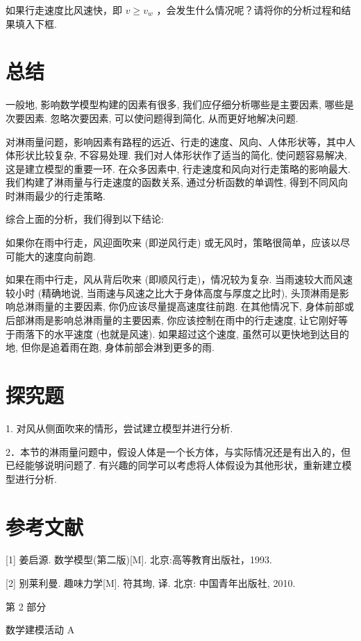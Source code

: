 \documentclass[10pt]{article}
\begin{document}
如果行走速度比风速快，即 \(v \geq  {v}_{w}\) ，会发生什么情况呢？请将你的分析过程和结果填入下框.

\section*{总结}

一般地, 影响数学模型构建的因素有很多, 我们应仔细分析哪些是主要因素, 哪些是次要因素. 忽略次要因素, 可以使问题得到简化, 从而更好地解决问题.

对淋雨量问题，影响因素有路程的远近、行走的速度、风向、人体形状等，其中人体形状比较复杂, 不容易处理. 我们对人体形状作了适当的简化, 使问题容易解决, 这是建立模型的重要一环. 在众多因素中, 行走速度和风向对行走策略的影响最大. 我们构建了淋雨量与行走速度的函数关系, 通过分析函数的单调性, 得到不同风向时淋雨最少的行走策略.

综合上面的分析，我们得到以下结论:

如果你在雨中行走，风迎面吹来 (即逆风行走) 或无风时，策略很简单，应该以尽可能大的速度向前跑.

如果在雨中行走，风从背后吹来 (即顺风行走)，情况较为复杂. 当雨速较大而风速较小时 (精确地说, 当雨速与风速之比大于身体高度与厚度之比时), 头顶淋雨是影响总淋雨量的主要因素, 你仍应该尽量提高速度往前跑. 在其他情况下, 身体前部或后部淋雨是影响总淋雨量的主要因素, 你应该控制在雨中的行走速度, 让它刚好等于雨落下的水平速度 (也就是风速). 如果超过这个速度, 虽然可以更快地到达目的地, 但你是追着雨在跑, 身体前部会淋到更多的雨.

\section*{探究题}

1. 对风从侧面吹来的情形，尝试建立模型并进行分析.

2．本节的淋雨量问题中，假设人体是一个长方体，与实际情况还是有出入的，但已经能够说明问题了. 有兴趣的同学可以考虑将人体假设为其他形状，重新建立模型进行分析.

\section*{参考文献}

[1] 姜启源. 数学模型(第二版)[M]. 北京:高等教育出版社，1993.

[2] 别莱利曼. 趣味力学[M]. 符其珣, 译. 北京: 中国青年出版社, 2010.



第 2 部分

数学建模活动 A
\end{document}
